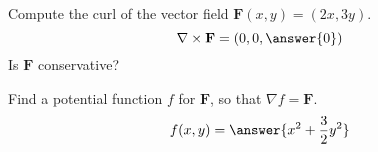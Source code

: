 \begin{problem}
Compute the curl of the vector field $\mathbf{F}(x,y) = (2x, 3y)$.
\[
\nabla\times\mathbf{F} = (0,0,\answer{0})
\]
Is $\mathbf{F}$ conservative?
\begin{multipleChoice}
\end{multipleChoice}
\begin{problem}
Find a potential function $f$ for $\mathbf{F}$, so that $\nabla f = \mathbf{F}$.
\[
f(x,y) = \answer{x^2+\frac{3}{2}y^2}
\]
\end{problem}
\end{problem}